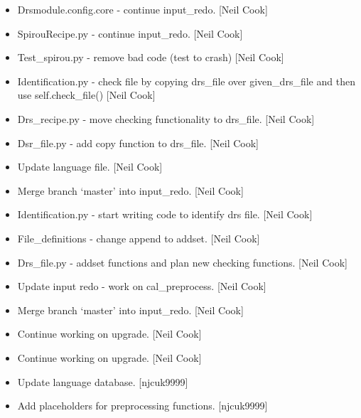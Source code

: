 \documentclass[a4paper,10pt,english]{report}
\begin{document}
\begin{itemize}
\item {} 
Drsmodule.config.core - continue input\_redo. {[}Neil Cook{]}

\item {} 
SpirouRecipe.py - continue input\_redo. {[}Neil Cook{]}

\item {} 
Test\_spirou.py - remove bad code (test to crash) {[}Neil Cook{]}

\item {} 
Identification.py - check file by copying drs\_file over given\_drs\_file
and then use self.check\_file() {[}Neil Cook{]}

\item {} 
Drs\_recipe.py - move checking functionality to drs\_file. {[}Neil Cook{]}

\item {} 
Dsr\_file.py - add copy function to drs\_file. {[}Neil Cook{]}

\item {} 
Update language file. {[}Neil Cook{]}

\item {} 
Merge branch ‘master’ into input\_redo. {[}Neil Cook{]}

\item {} 
Identification.py - start writing code to identify drs file. {[}Neil
Cook{]}

\item {} 
File\_definitions - change append to addset. {[}Neil Cook{]}

\item {} 
Drs\_file.py - addset functions and plan new checking functions. {[}Neil
Cook{]}

\item {} 
Update input redo - work on cal\_preprocess. {[}Neil Cook{]}

\item {} 
Merge branch ‘master’ into input\_redo. {[}Neil Cook{]}

\item {} 
Continue working on upgrade. {[}Neil Cook{]}

\item {} 
Continue working on upgrade. {[}Neil Cook{]}

\item {} 
Update language database. {[}njcuk9999{]}

\item {} 
Add placeholders for preprocessing functions. {[}njcuk9999{]}


\end{itemize}
\end{document}
